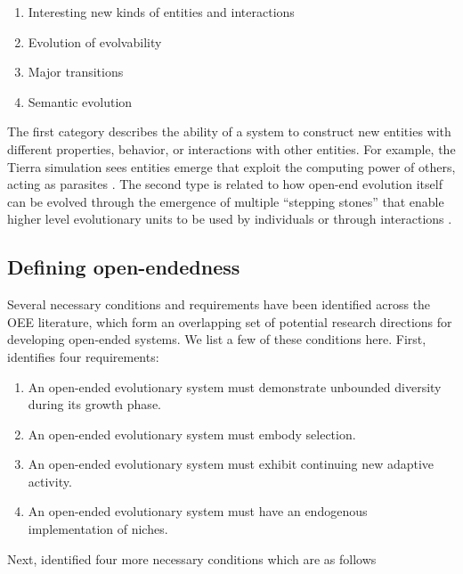 \begin{enumerate}
  \item Interesting new kinds of entities and interactions
  \item Evolution of evolvability
  \item Major transitions
  \item Semantic evolution
\end{enumerate}

The first category describes the ability of a system to construct new entities
with different properties, behavior, or interactions with other entities. For
example, the Tierra simulation sees entities emerge that exploit the computing
power of others, acting as parasites \parencite{srayApproachSynthesisLife1991}.
The second type is related to how open-end evolution itself can be evolved
through the emergence of multiple ``stepping stones'' that enable higher level
evolutionary units to be used by individuals or through interactions
\parencite{patteeEvolvedOpenEndednessNot2019}.

\subsection{Defining open-endedness}

Several necessary conditions and requirements have been identified across the
\ac{OEE} literature, which form an overlapping set of potential research
directions for developing open-ended systems. We list a few of these conditions
here. First, \textcite{maleyFourStepsOpenended1999} identifies four requirements:

\begin{enumerate}
  \item An open-ended evolutionary system must demonstrate unbounded diversity
        during its growth phase.
  \item An open-ended evolutionary system must embody selection.
  \item An open-ended evolutionary system must exhibit continuing new adaptive
        activity.
  \item An open-ended evolutionary system must have an endogenous implementation
        of niches.
\end{enumerate}
Next, \textcite{sorosIdentifyingNecessaryConditions2014} identified four more necessary
conditions which are as follows

